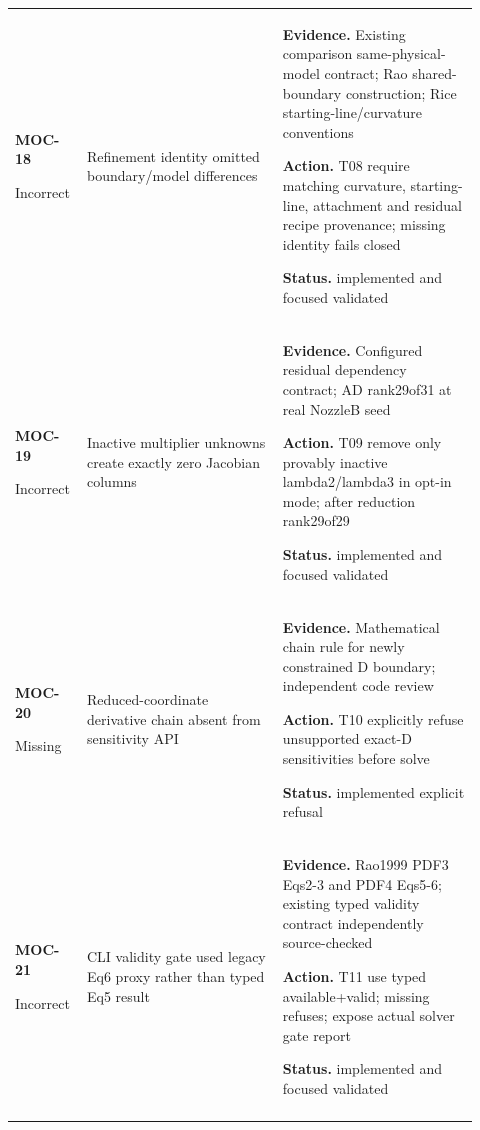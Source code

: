 \begin{longtable}{@{}P{0.12\linewidth}P{0.40\linewidth}P{0.40\linewidth}@{}}
\textbf{MOC-18}\par Incorrect & Refinement identity omitted boundary/model differences\par {} & \textbf{Evidence.} Existing comparison same-physical-model contract; Rao shared-boundary construction; Rice starting-line/curvature conventions\par \textbf{Action.} T08 require matching curvature, starting-line, attachment and residual recipe provenance; missing identity fails closed\par \textbf{Status.} implemented and focused validated\\ \addlinespace[5pt]
\textbf{MOC-19}\par Incorrect & Inactive multiplier unknowns create exactly zero Jacobian columns\par {} & \textbf{Evidence.} Configured residual dependency contract; AD rank29of31 at real NozzleB seed\par \textbf{Action.} T09 remove only provably inactive lambda2/lambda3 in opt-in mode; after reduction rank29of29\par \textbf{Status.} implemented and focused validated\\ \addlinespace[5pt]
\textbf{MOC-20}\par Missing & Reduced-coordinate derivative chain absent from sensitivity API\par {} & \textbf{Evidence.} Mathematical chain rule for newly constrained D boundary; independent code review\par \textbf{Action.} T10 explicitly refuse unsupported exact-D sensitivities before solve\par \textbf{Status.} implemented explicit refusal\\ \addlinespace[5pt]
\textbf{MOC-21}\par Incorrect & CLI validity gate used legacy Eq6 proxy rather than typed Eq5 result\par {} & \textbf{Evidence.} Rao1999 PDF3 Eqs2-3 and PDF4 Eqs5-6; existing typed validity contract independently source-checked\par \textbf{Action.} T11 use typed available+valid; missing refuses; expose actual solver gate report\par \textbf{Status.} implemented and focused validated\\ \addlinespace[5pt]

\end{longtable}
